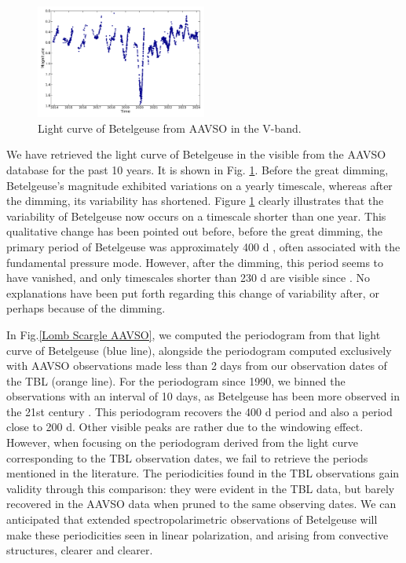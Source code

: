 \documentclass{aa}
\begin{document}
\begin{figure}[!h]
    \centering
    \includegraphics[width=0.5\textwidth]{Light_curve_Betelgeuse.pdf}
    \caption{Light curve of Betelgeuse from AAVSO in the V-band.}
    \label{light curve Betelgeuse}
\end{figure}


We have retrieved the light curve of Betelgeuse in the visible from the AAVSO database for the past 10 years. It is shown in Fig. \ref{light curve Betelgeuse}.
Before the great dimming, Betelgeuse's magnitude exhibited variations on a yearly timescale, whereas after the dimming, its variability has shortened. 
Figure \ref{light curve Betelgeuse} clearly illustrates that the 
variability of Betelgeuse now occurs on a timescale shorter than one year. This qualitative change has been pointed out before,
before the great dimming, the primary period of Betelgeuse was approximately 400 d \citep{kiss_variability_2006}, often associated with the fundamental pressure mode. However, after the dimming, this period seems to have vanished, and only timescales shorter than 230 d are visible since \citep{dupree_great_2022}. 
No explanations have been put forth regarding this change of variability after, or perhaps because of the dimming.%

 In Fig.\ref{Lomb Scargle AAVSO}, we computed the periodogram from that light curve of Betelgeuse (blue line), alongside the periodogram computed exclusively with AAVSO observations made less than 2 days from our observation dates of the TBL (orange line). 
 For the periodogram since 1990, we binned the observations with an interval of 10 days, as Betelgeuse has been more observed in the 21st century \citep{kiss_variability_2006}. This periodogram  recovers the 400 d period and also a period close to 200 d. Other visible peaks are rather 
 due to the windowing effect.   However, when focusing on the periodogram derived from the light curve corresponding to the TBL observation dates, we fail to retrieve the periods mentioned in the literature. The periodicities found in the TBL observations 
 gain validity through this comparison: they were evident in the TBL data, but barely recovered in the AAVSO data when pruned to the same observing dates. We can anticipated that extended spectropolarimetric observations 
 of Betelgeuse will make these periodicities seen in linear polarization, and arising from convective structures, clearer and clearer.
\end{document}
